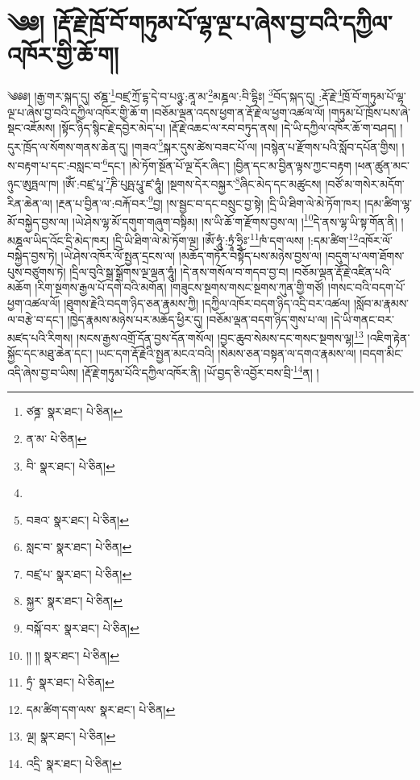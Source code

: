 \setcounter{footnote}{0} 
\chapter{༄༅། །རྡོ་རྗེ་ཁྲོ་བོ་གཏུམ་པོ་ལྷ་ལྔ་པ་ཞེས་བྱ་བའི་དཀྱིལ་འཁོར་གྱི་ཆོ་ག།}༄༅༅། །རྒྱ་གར་སྐད་དུ། ཙཎྜ་\footnote{ཙནྜ་  སྣར་ཐང་།  པེ་ཅིན། }བཛྲ་ཀྲོ་དྷ་དེ་བ་པཉྩ་:ནཱ་མ་\footnote{ན་མ་  པེ་ཅིན། }མཎྜལ་:བི་དྷིཿ། \footnote{བི་  སྣར་ཐང་།  པེ་ཅིན། }བོད་སྐད་དུ། :རྡོ་རྗེ་\footnote{}ཁྲོ་བོ་གཏུམ་པོ་ལྷ་ལྔ་པ་ཞེས་བྱ་བའི་དཀྱིལ་འཁོར་གྱི་ཆོ་ག །བཅོམ་ལྡན་འདས་ཕྱག་ན་རྡོ་རྗེ་ལ་ཕྱག་འཚལ་ལོ། །གཏུམ་པོ་ཁྲོས་པས་ཞེ་སྡང་འཇོམས། །སྟོང་ཉིད་སྙིང་རྗེ་དབྱེར་མེད་པ། །རྡོ་རྗེ་འཆང་ལ་རབ་བཏུད་ནས། །དེ་ཡི་དཀྱིལ་འཁོར་ཆོ་ག་བཤད། །དུར་ཁྲོད་ལ་སོགས་གནས་ཆེན་དུ། །གཟའ་\footnote{བཟའ་  སྣར་ཐང་།  པེ་ཅིན། }སྐར་དུས་ཚེས་བཟང་པོ་ལ། །བསྙེན་པ་རྫོགས་པའི་སློབ་དཔོན་གྱིས། །ས་བརྟག་པ་དང་:བསླང་བ་\footnote{སླང་བ་  སྣར་ཐང་།  པེ་ཅིན། }དང་། །མེ་ཏོག་སྔོན་པོ་ལྔ་དོར་ཞིང་། །བྱིན་དང་མ་བྱིན་ལྟས་ཀྱང་བརྟག །ཕན་ཚུན་མང་ཉུང་ཨུཏྤལ་ཁ། །ཨོཾ་:བཛྲ་པཱ་\footnote{བཛྲ་པ་  སྣར་ཐང་།  པེ་ཅིན། }ཎི་པུཥྤ་པཱུ་ཛ་ཧཱུཾ། །སྔགས་དེར་བསྐྱར་\footnote{སྐྱར་  སྣར་ཐང་།  པེ་ཅིན། }ཞིང་མེད་དང་མཚུངས། །བཙོ་མ་གསེར་མདོག་རིན་ཆེན་ལ། །རྔན་པ་བྱིན་ལ་:བརྐོ་བར་\footnote{བསྐོ་བར་  སྣར་ཐང་།  པེ་ཅིན། }བྱ། །ས་སྦྱང་བ་དང་བསྲུང་བྱ་སྟེ། །དྲི་ཡི་ཐིག་ལེ་མེ་ཏོག་ཁར། །དམ་ཚིག་ལྷ་མོ་བསྐྱེད་བྱས་ལ། །ཡེ་ཤེས་ལྷ་མོ་དགུག་གཞུག་བསྟིམ། །ས་ཡི་ཆོ་ག་རྫོགས་བྱས་ལ། །\footnote{།། །།  སྣར་ཐང་།  པེ་ཅིན། }དེ་ནས་ལྷ་ཡི་སྟ་གོན་ནི། །མཎྜལ་ཡིད་འོང་དྲི་མེད་ཁར། །དྲི་ཡི་ཐིག་ལེ་མེ་ཏོག་ལྔ། །ཨོཾ་ཧཱུཾ་:ཏྲཱཾ་ཧྲཱིཿ་\footnote{ཏྲཾ་  སྣར་ཐང་།  པེ་ཅིན། }ཁཾ་དག་ལས། །:དམ་ཚིག་\footnote{དམ་ཚིག་དག་ལས་  སྣར་ཐང་།  པེ་ཅིན། }འཁོར་ལོ་བསྐྱེད་བྱས་ཏེ། །ཡེ་ཤེས་འཁོར་ལོ་སྤྱན་དྲངས་ལ། །མཆོད་གཏོར་བསྟོད་པས་མཉེས་བྱས་ལ། །བདུག་པ་ལག་ཐོགས་པུས་བཙུགས་ཏེ། །དྲིལ་བུའི་སྒྲ་སྒྲོགས་ལྔ་ལྡན་ཧཱུཾ། །དེ་ནས་གསོལ་བ་གདབ་བྱ་བ། །བཅོམ་ལྡན་རྡོ་རྗེ་འཛིན་པའི་མཆོག །རིག་སྔགས་རྒྱལ་པོ་དགེ་བའི་མགོན། །གཟུངས་སྔགས་གསང་སྔགས་ཀུན་གྱི་གཙོ། །གསང་བའི་བདག་པོ་ཕྱག་འཚལ་ལོ། །ཐུགས་རྗེའི་བདག་ཉིད་ཅན་རྣམས་ཀྱི། །དཀྱིལ་འཁོར་བདག་ཉིད་འདྲི་བར་འཚལ། །སློབ་མ་རྣམས་ལ་བརྩེ་བ་དང་། །ཁྱེད་རྣམས་མཉེས་པར་མཆོད་ཕྱིར་དུ། །བཅོམ་ལྡན་བདག་ཉིད་གུས་པ་ལ། །དེ་ཡི་གནང་བར་མཛད་པའི་རིགས། །སངས་རྒྱས་འགྲོ་དོན་བྱས་དོན་གསོལ། །བྱང་ཆུབ་སེམས་དང་གསང་སྔགས་ལྷ།\footnote{ལྔ།  སྣར་ཐང་།  པེ་ཅིན། } །འཇིག་རྟེན་སྐྱོང་དང་མཐུ་ཆེན་དང་། །ཡང་དག་རྡོ་རྗེའི་སྤྱན་མངའ་བའི། །སེམས་ཅན་བསྟན་ལ་དགའ་རྣམས་ལ། །བདག་མིང་འདི་ཞེས་བྱ་བ་ཡིས། །རྡོ་རྗེ་གཏུམ་པོའི་དཀྱིལ་འཁོར་ནི། །ཡོ་བྱད་ཅི་འབྱོར་བས་བྲི་\footnote{འདྲི་  སྣར་ཐང་།  པེ་ཅིན། }ན། །
